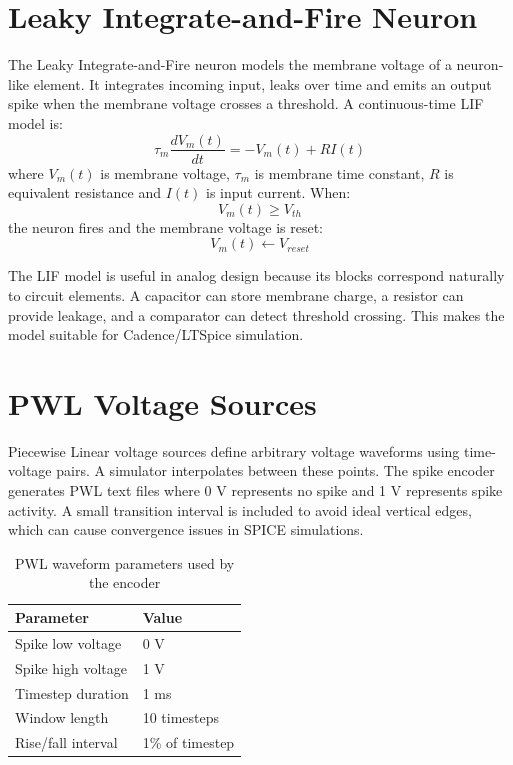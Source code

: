 \section{Leaky Integrate-and-Fire Neuron}

The Leaky Integrate-and-Fire neuron models the membrane voltage of a neuron-like element. It integrates incoming input, leaks over time and emits an output spike when the membrane voltage crosses a threshold. A continuous-time LIF model is:
\begin{equation}
\tau_m \frac{dV_m(t)}{dt} = -V_m(t) + RI(t)
\end{equation}
where $V_m(t)$ is membrane voltage, $\tau_m$ is membrane time constant, $R$ is equivalent resistance and $I(t)$ is input current. When:
\begin{equation}
V_m(t) \geq V_{th}
\end{equation}
the neuron fires and the membrane voltage is reset:
\begin{equation}
V_m(t) \leftarrow V_{reset}
\end{equation}

The LIF model is useful in analog design because its blocks correspond naturally to circuit elements. A capacitor can store membrane charge, a resistor can provide leakage, and a comparator can detect threshold crossing. This makes the model suitable for Cadence/LTSpice simulation.

\section{PWL Voltage Sources}

Piecewise Linear voltage sources define arbitrary voltage waveforms using time-voltage pairs. A simulator interpolates between these points. The spike encoder generates PWL text files where 0 V represents no spike and 1 V represents spike activity. A small transition interval is included to avoid ideal vertical edges, which can cause convergence issues in SPICE simulations.

\begin{table}[H]
\centering
\caption{PWL waveform parameters used by the encoder}
\label{tab:pwlparams}
\begin{tabular}{|p{}|p{}|}
\hline
\textbf{Parameter} & \textbf{Value} \\
\hline
Spike low voltage & 0 V \\
\hline
Spike high voltage & 1 V \\
\hline
Timestep duration & 1 ms \\
\hline
Window length & 10 timesteps \\
\hline
Rise/fall interval & 1\% of timestep \\
\hline
\end{tabular}
\end{table}

